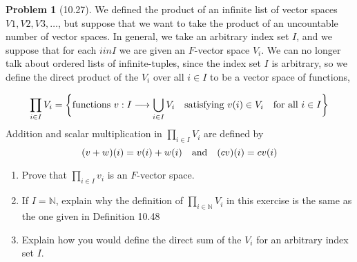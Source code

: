 \documentclass[12pt]{article}
\theoremstyle{definition}
\newtheorem{problem}{Problem}
\begin{document}
\begin{problem}[10.27]
    We defined the product of an infinite list of vector spaces $V1, V2, V3, \ldots$, but suppose that we want to 
    take the product of an uncountable number of vector spaces. In general, we take an arbitrary index set $I$, 
    and we suppose that for each $i in I$ we are given an $F$-vector space $V_i$. We can no longer talk about ordered 
    lists of infinite-tuples, since the index set $I$ is arbitrary, so we define the direct product of the $V_i$ over 
    all $i \in I$ to be a vector space of functions,

    \[
        \prod_{i \in I}V_i = \biggl\{ \text{functions }v : I \longrightarrow \bigcup_{i \in I} V_i \hspace{10px}\text{satisfying } v(i) \in V_i \hspace{10px}\text{for all } i \in I \biggr\}
    \]
    Addition and scalar multiplication in $\prod_{i \in I}V_i$ are defined by
    \[
        (v + w)(i) = v(i) + w(i) \hspace{10px} \text{and} \hspace{10px} (cv)(i) = cv(i)
    \]
    \begin{enumerate}[label=(\alph*)]
        \item Prove that $\prod_{i \in I} v_i$ is an $F$-vector space.
        \begin{solution}

        \end{solution}

        \item If $I = \mathbb{N}$, explain why the definition of $\prod_{i \in \mathbb{N}} V_i$ in this exercise is the same as the one given
        in Definition 10.48
        \begin{solution}

        \end{solution}

        \item Explain how you would define the direct sum of the $V_i$ for an arbitrary index set $I$.
        \begin{solution}

        \end{solution}
    \end{enumerate}
\end{problem}
\end{document}
